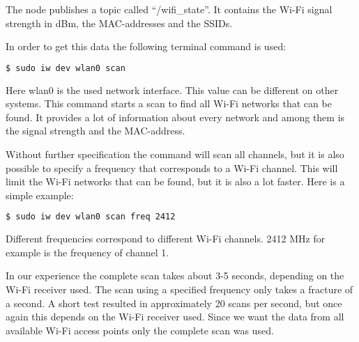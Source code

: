 The node publishes a topic called ``/wifi\_state''. It contains the Wi-Fi signal strength in dBm, the MAC-addresses and the SSIDs. 

In order to get this data the following terminal command is used:
\begin{lstlisting}[language=bash]
  $ sudo iw dev wlan0 scan 
\end{lstlisting}
Here wlan0 is the used network interface. This value can be different on other systems. This command starts a scan to find all Wi-Fi networks that can be found. It provides a lot of information about every network and among them is the signal strength and the MAC-address. 

Without further specification the command will scan all channels, but it is also possible to specify a frequency that corresponds to a Wi-Fi channel. This will limit the Wi-Fi networks that can be found, but it is also a lot faster. Here is a simple example:
\begin{lstlisting}[language=bash]
  $ sudo iw dev wlan0 scan freq 2412
\end{lstlisting}
Different frequencies correspond to different Wi-Fi channels. 2412 MHz for example is the frequency of channel 1. 

In our experience the complete scan takes about 3-5 seconds, depending on the Wi-Fi receiver used. The scan using a specified frequency only takes a fracture of a second. A short test resulted in approximately 20 scans per second, but once again this depends on the Wi-Fi receiver used. Since we want the data from all available Wi-Fi access points only the complete scan was used.

